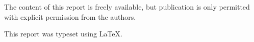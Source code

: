 \thispagestyle{empty}
{\small
\strut\vfill %

\noindent The content of this report is freely available, but publication is only permitted with explicit permission from the authors.
\vspace{0.2cm}

\noindent This report was typeset using \LaTeX.
\vspace{0.2cm}

}
\clearpage
